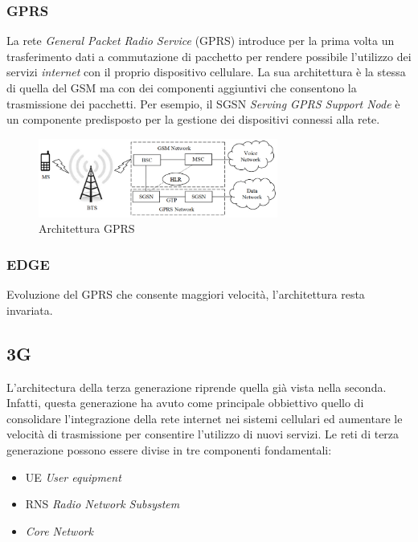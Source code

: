 \subsubsection{GPRS}
La rete \textit{General Packet Radio Service} (GPRS) introduce per la prima volta un trasferimento dati a commutazione di pacchetto per rendere 
possibile l'utilizzo dei servizi \textit{internet} con il proprio dispositivo cellulare\cite{gsm-architecture}.
La sua architettura è la stessa di quella del GSM ma con dei componenti aggiuntivi che consentono la trasmissione dei pacchetti. 
Per esempio, il SGSN \textit{Serving GPRS Support Node} è un componente predisposto per la gestione dei dispositivi connessi alla rete.
\begin{figure}[ht]
    \centering
    \includegraphics[width=0.7\textwidth]{images/2g-gprs.png}
    \caption{Architettura GPRS}
\end{figure}
\subsubsection{EDGE}
Evoluzione del GPRS che consente maggiori velocità, l'architettura resta invariata.

\clearpage

\subsection{3G}
L'architectura della terza generazione riprende quella già vista nella seconda. Infatti, questa generazione ha avuto come principale obbiettivo 
quello di consolidare l'integrazione della rete internet nei sistemi cellulari ed aumentare le velocità di trasmissione per consentire l'utilizzo 
di nuovi servizi.
Le reti di terza generazione possono essere divise in tre componenti fondamentali:
\begin{itemize}
    \item UE \textit{User equipment}
    \item RNS \textit{Radio Network Subsystem}
    \item \textit{Core Network}
\end{itemize}

